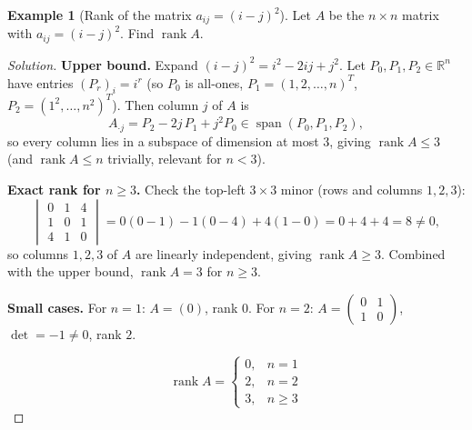 \documentclass[11pt]{article}
\theoremstyle{definition}
\newtheorem{example}{Example}[section]
\newcommand{\R}{\mathbb{R}}
\newcommand{\rank}{\operatorname{rank}}
\newcommand{\Span}{\operatorname{span}}
\begin{document}
\begin{example}[Rank of the matrix $a_{ij}=(i-j)^2$]
Let $A$ be the $n\times n$ matrix with $a_{ij}=(i-j)^2$. Find $\rank A$.
\end{example}
\begin{proof}[Solution]
\textbf{Upper bound.} Expand $(i-j)^2=i^2-2ij+j^2$. Let $P_0,P_1,P_2\in\R^n$ have entries $(P_r)_i=i^r$ (so $P_0$ is all-ones, $P_1=(1,2,\dots,n)^T$, $P_2=(1^2,\dots,n^2)^T$). Then column $j$ of $A$ is
\[
A_{\cdot j}=P_2-2j\,P_1+j^2P_0\in\Span(P_0,P_1,P_2),
\]
so every column lies in a subspace of dimension at most $3$, giving $\rank A\le3$ (and $\rank A\le n$ trivially, relevant for $n<3$).

\textbf{Exact rank for $n\ge3$.} Check the top-left $3\times3$ minor (rows and columns $1,2,3$):
\[
\begin{vmatrix}0&1&4\\1&0&1\\4&1&0\end{vmatrix}=0(0-1)-1(0-4)+4(1-0)=0+4+4=8\ne0,
\]
so columns $1,2,3$ of $A$ are linearly independent, giving $\rank A\ge3$. Combined with the upper bound, $\rank A=3$ for $n\ge3$.

\textbf{Small cases.} For $n=1$: $A=(0)$, rank $0$. For $n=2$: $A=\begin{pmatrix}0&1\\1&0\end{pmatrix}$, $\det=-1\ne0$, rank $2$.

\[
\boxed{\rank A=\begin{cases}0,& n=1\\2,& n=2\\3,& n\ge3\end{cases}}
\]
\end{proof}
\end{document}
